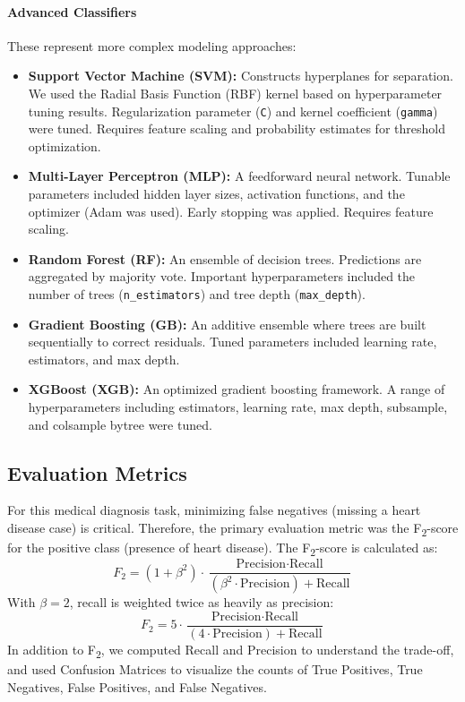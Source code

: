 \documentclass{article}
\begin{document}
\paragraph{Advanced Classifiers}
These represent more complex modeling approaches:
\begin{itemize}
    \item \textbf{Support Vector Machine (SVM):} Constructs hyperplanes for separation. We used the Radial Basis Function (RBF) kernel based on hyperparameter tuning results. Regularization parameter (\texttt{C}) and kernel coefficient (\texttt{gamma}) were tuned. Requires feature scaling and probability estimates for threshold optimization.
    \item \textbf{Multi-Layer Perceptron (MLP):} A feedforward neural network. Tunable parameters included hidden layer sizes, activation functions, and the optimizer (Adam was used). Early stopping was applied. Requires feature scaling.
    \item \textbf{Random Forest (RF):} An ensemble of decision trees. Predictions are aggregated by majority vote. Important hyperparameters included the number of trees (\texttt{n\_estimators}) and tree depth (\texttt{max\_depth}).
    \item \textbf{Gradient Boosting (GB):} An additive ensemble where trees are built sequentially to correct residuals. Tuned parameters included learning rate, estimators, and max depth.
    \item \textbf{XGBoost (XGB):} An optimized gradient boosting framework. A range of hyperparameters including estimators, learning rate, max depth, subsample, and colsample bytree were tuned.
\end{itemize}

\subsection{Evaluation Metrics}
\label{sec:evaluation_metrics} %

For this medical diagnosis task, minimizing false negatives (missing a heart disease case) is critical. Therefore, the primary evaluation metric was the F\textsubscript{2}-score for the positive class (presence of heart disease). The F\textsubscript{2}-score is calculated as:
$$ F_2 = (1 + \beta^2) \cdot \frac{\text{Precision} \cdot \text{Recall}}{(\beta^2 \cdot \text{Precision}) + \text{Recall}} $$
With $\beta=2$, recall is weighted twice as heavily as precision:
$$ F_2 = 5 \cdot \frac{\text{Precision} \cdot \text{Recall}}{(4 \cdot \text{Precision}) + \text{Recall}} $$
In addition to F\textsubscript{2}, we computed Recall and Precision to understand the trade-off, and used Confusion Matrices to visualize the counts of True Positives, True Negatives, False Positives, and False Negatives.
\end{document}
